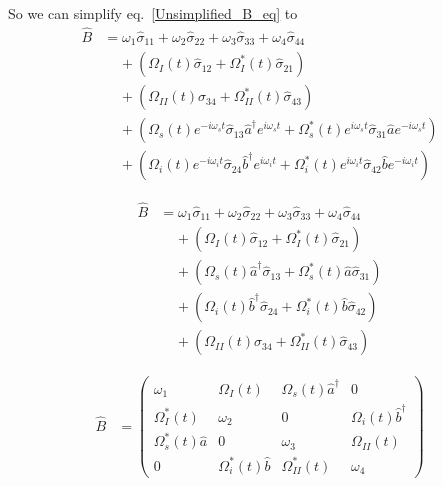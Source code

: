 \documentclass[aps,pra,showpacs,amsmath,amssymb,nofootinbib,longbibliography,superscriptaddress
]{revtex4-1}
\theoremstyle{definition}
\theoremstyle{remark}
\newcommand{\0}{\hat{0}}
\begin{document}
So we can simplify eq.~\eqref{Unsimplified_B_eq} to
\begin{align}
    \hat{B}
    &=
    \omega_1 \hat{\sigma}_{11} + \omega_2 \hat{\sigma}_{22} + \omega_3 \hat{\sigma}_{33} + \omega_4 \hat{\sigma}_{44} \nonumber \\
    &\;\;\;\;+
    \left(
        \Omega_{I}(t) \hat{\sigma}_{12} +
        \Omega_{I}^*(t) \hat{\sigma}_{21}
    \right)\nonumber \\
    &\;\;\;\;+
    \left(
        \Omega_{II}(t) \hat{\sigma}_{34} +
        \Omega_{II}^*(t) \hat{\sigma}_{43}
    \right) \nonumber \\
    &\;\;\;\;+
    \left(
        \Omega_{s}(t) e^{-i \omega_s t} \hat{\sigma}_{13} \hat{a}^{\dagger} e^{i \omega_s t} +
        \Omega_{s}^*(t) e^{i \omega_s t} \hat{\sigma}_{31} \hat{a} e^{-i \omega_s t}
    \right) \nonumber \\
    &\;\;\;\;+
    \left(
        \Omega_{i}(t) e^{-i\omega_i t} \hat{\sigma}_{24} \hat{b}^{\dagger} e^{i \omega_i t}
        + \Omega_{i}^*(t) e^{i\omega_i t} \hat{\sigma}_{42} \hat{b} e^{-i \omega_i t}
    \right)\nonumber
\end{align}

\begin{align}
    \hat{B}
    &=
    \omega_1 \hat{\sigma}_{11} + \omega_2 \hat{\sigma}_{22} + \omega_3 \hat{\sigma}_{33} + \omega_4 \hat{\sigma}_{44} \nonumber \\
    &\;\;\;\;+
    \left(
        \Omega_{I}(t) \hat{\sigma}_{12} +
        \Omega_{I}^*(t) \hat{\sigma}_{21}
    \right)\nonumber \\
    &\;\;\;\;+
    \left(
        \Omega_{s}(t) \hat{a}^{\dagger} \hat{\sigma}_{13} +
        \Omega_{s}^*(t) \hat{a} \hat{\sigma}_{31}
    \right) \nonumber \\
    &\;\;\;\;+
    \left(
        \Omega_{i}(t) \hat{b}^{\dagger} \hat{\sigma}_{24} +
        \Omega_{i}^*(t) \hat{b} \hat{\sigma}_{42}
    \right) \nonumber \\
    &\;\;\;\;+
    \left(
        \Omega_{II}(t) \hat{\sigma}_{34} +
        \Omega_{II}^*(t) \hat{\sigma}_{43}
    \right)
\end{align}

\begin{align}
    \hat{B} &= \left(\begin{array}{cccc}
        \omega_1  & \Omega_{I}(t) & \Omega_{s}(t) \hat{a}^{\dagger} & 0\\
        \Omega_{I}^*(t) & \omega_2  & 0 & \Omega_{i}(t) \hat{b}^{\dagger}\\
        \Omega_{s}^*(t) \hat{a} & 0 & \omega_3 & \Omega_{II}(t)\\
        0 & \Omega_{i}^*(t) \hat{b} & \Omega_{II}^*(t) & \omega_4
    \end{array}\right)
\end{align}
\end{document}
